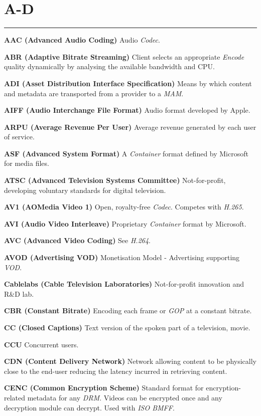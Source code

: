 \section{A-D}
\hrule

\medskip
\textbf{AAC (Advanced Audio Coding)}
Audio \textit{Codec}.

\smallskip
\textbf{ABR (Adaptive Bitrate Streaming)}
Client selects an appropriate \textit{Encode} quality dynamically by analysing the available bandwidth and CPU.

\smallskip
\textbf{ADI (Asset Distribution Interface Specification)}
Means by which content and metadata are transported from a provider to a \textit{MAM}.

\smallskip
\textbf{AIFF (Audio Interchange File Format)}
Audio format developed by Apple.

\smallskip
\textbf{ARPU (Average Revenue Per User)}
Average revenue generated by each user of service.

\smallskip
\textbf{ASF (Advanced System Format)}
A \textit{Container} format defined by Microsoft for media files.

\smallskip
\textbf{ATSC (Advanced Television Systems Committee)}
Not-for-profit, developing voluntary standards for digital television.

\smallskip
\textbf{AV1 (AOMedia Video 1)}
Open, royalty-free \textit{Codec}. Competes with \textit{H.265}.

\smallskip
\textbf{AVI (Audio Video Interleave)}
Proprietary \textit{Container} format by Microsoft.

\smallskip
\textbf{AVC (Advanced Video Coding)}
See \textit{H.264}.

\smallskip
\textbf{AVOD (Advertising VOD)}
Monetisation Model - Advertising supporting \textit{VOD}.

\smallskip
\textbf{Cablelabs (Cable Television Laboratories)}
Not-for-profit innovation and R\&D lab.

\smallskip
\textbf{CBR (Constant Bitrate)}
Encoding each frame or \textit{GOP} at a constant bitrate.

\smallskip
\textbf{CC (Closed Captions)}
Text version of the spoken part of a television, movie.

\smallskip
\textbf{CCU}
Concurrent users.

\smallskip
\textbf{CDN (Content Delivery Network)}
Network allowing content to be physically close to the end-user reducing the latency incurred in retrieving content.

\smallskip
\textbf{CENC (Common Encryption Scheme)}
Standard format for encryption-related metadata for any \textit{DRM}. Videos can be encrypted once and any decryption module can decrypt.  Used with \textit{ISO BMFF}.

